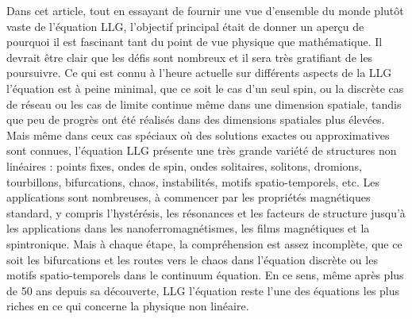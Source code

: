\documentclass{article}
\begin{document}
   Dans cet article, tout en essayant de fournir une vue d'ensemble du monde plutôt vaste
   de l'équation LLG, l'objectif principal était de donner un aperçu de pourquoi
   il est fascinant tant du point de vue physique que mathématique. Il
   devrait être clair que les défis sont nombreux et il sera très gratifiant
   de les poursuivre. Ce qui est connu à l'heure actuelle sur différents aspects de la LLG
   l'équation est à peine minimal, que ce soit le cas d'un seul spin, ou la discrète
   cas de réseau ou les cas de limite continue même dans une dimension spatiale, tandis que
   peu de progrès ont été réalisés dans des dimensions spatiales plus élevées. Mais même dans ceux
   cas spéciaux où des solutions exactes ou approximatives sont connues, l'équation LLG
   présente une très grande variété de structures non linéaires : points fixes, ondes de spin,
   ondes solitaires, solitons, dromions, tourbillons, bifurcations, chaos, instabilités,
   motifs spatio-temporels, etc. Les applications sont nombreuses, à commencer par les propriétés magnétiques standard, y compris l'hystérésis, les résonances et les facteurs de structure jusqu'à
   les applications dans les nanoferromagnétismes, les films magnétiques et la spintronique. Mais à chaque
   étape, la compréhension est assez incomplète, que ce soit les bifurcations et les routes
   vers le chaos dans l'équation discrète ou les motifs spatio-temporels dans le continuum
   équation. En ce sens, même après plus de 50 ans depuis sa découverte, LLG
   l'équation reste l'une des équations les plus riches en ce qui concerne la physique non linéaire.
   
   
	
\end{document}
